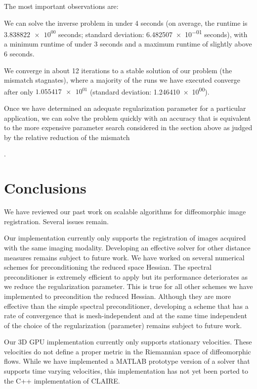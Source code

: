 \documentclass[11pt]{amsart}
\newcommand\fnum[1]{\num[scientific-notation=fixed,round-precision=3,round-mode=places]{#1}}
\begin{document}
The most important observations are: \begin{enumerate*}[label=(\roman*)] \item We can solve the inverse problem in under 4 seconds (on average, the runtime is $\fnum{3.838822e+00}$ seconds; standard deviation: \fnum{6.482507e-01} seconds), with a minimum runtime of under 3 seconds and a maximum runtime of slightly above 6 seconds. \item We converge in about 12 iterations to a stable solution of our problem (the mismatch stagnates), where a majority of the runs we have executed converge after only $\fnum{1.055417e+01}$ (standard deviation: \fnum{1.246410e+00}). \item Once we have determined an adequate regularization parameter for a particular application, we can solve the problem quickly with an accuracy that is equivalent to the more expensive parameter search considered in the section above as judged by the relative reduction of the mismatch\end{enumerate*}.




\section{Conclusions}\label{s:conclusions}

We have reviewed our past work on scalable algorithms for diffeomorphic image registration. Several issues remain.

Our implementation currently only supports the registration of images acquired with the same imaging modality. Developing an effective solver for other distance measures remains subject to future work. We have worked on several numerical schemes for preconditioning the reduced space Hessian. The spectral preconditioner is extremely efficient to apply but its performance deteriorates as we reduce the regularization parameter. This is true for all other schemes we have implemented to precondition the reduced Hessian. Although they are more effective than the simple spectral preconditioner, developing a scheme that has a rate of convergence that is mesh-independent and at the same time independent of the choice of the regularization (parameter) remains subject to future work.

Our 3D GPU implementation currently only supports stationary velocities. These velocities do not define a proper metric in the Riemannian space of diffeomorphic flows. While we have implemented a MATLAB prototype version of a solver that supports time varying velocities, this implementation has not yet been ported to the C++ implementation of CLAIRE.
\end{document}
